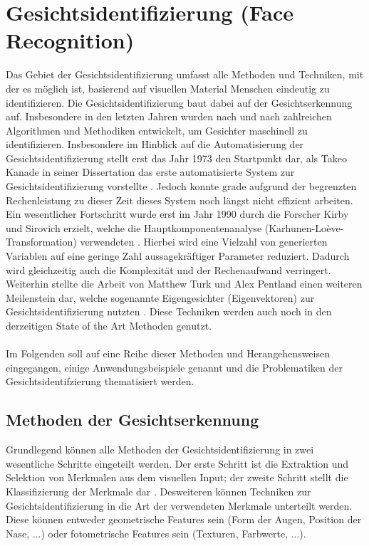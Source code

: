 \documentclass[doktyp=semarbeit, sprache=german]{TUBAFarbeiten}
\begin{document}
\section{Gesichtsidentifizierung (Face Recognition)}
Das Gebiet der Gesichtsidentifizierung umfasst alle Methoden und Techniken, mit der es möglich ist, basierend auf visuellen Material Menschen eindeutig zu identifizieren. Die Gesichtsidentifizierung baut dabei auf der Gesichtserkennung auf. Insbesondere in den letzten Jahren wurden nach und nach zahlreichen Algorithmen und Methodiken entwickelt, um Gesichter maschinell zu identifizieren. Insbesondere im Hinblick auf die Automatisierung der Gesichtsidentifizierung stellt erst das Jahr 1973 den Startpunkt dar, als Takeo Kanade in seiner Dissertation das erste automatisierte System zur Gesichtsidentifizierung vorstellte \cite{Takeo}. Jedoch konnte grade aufgrund der begrenzten Rechenleistung zu dieser Zeit dieses System noch längst nicht effizient arbeiten. Ein wesentlicher Fortschritt wurde erst im Jahr 1990 durch die Forscher Kirby und Sirovich erzielt, welche die Hauptkomponentenanalyse (Karhunen-Loève-Transformation) verwendeten \cite{Kirby}. Hierbei wird eine Vielzahl von generierten Variablen auf eine geringe Zahl aussagekräftiger Parameter reduziert. Dadurch wird gleichzeitig auch die Komplexität und der Rechenaufwand verringert. Weiterhin stellte die Arbeit von Matthew Turk und Alex Pentland einen weiteren Meilenstein dar, welche sogenannte Eigengesichter (Eigenvektoren) zur Gesichtsidentifizierung nutzten \cite{Turk}. Diese Techniken werden auch noch in den derzeitigen State of the Art Methoden genutzt.
\\\\Im Folgenden soll auf eine Reihe dieser Methoden und Herangehensweisen eingegangen, einige Anwendungsbeispiele genannt und die Problematiken der Gesichtsidentifzierung thematisiert werden.
\subsection{Methoden der Gesichtserkennung}
Grundlegend können alle Methoden der Gesichtsidentifizierung in zwei wesentliche Schritte eingeteilt werden. Der erste Schritt ist die Extraktion und Selektion von Merkmalen aus dem visuellen Input; der zweite Schritt stellt die Klassifizierung der Merkmale dar \cite{FRS}. Desweiteren können Techniken zur Gesichtsidentifizierung in die Art der verwendeten Merkmale unterteilt werden. Diese können entweder geometrische Features sein (Form der Augen, Position der Nase, ...) oder fotometrische Features sein (Texturen, Farbwerte, ...).
\end{document}
